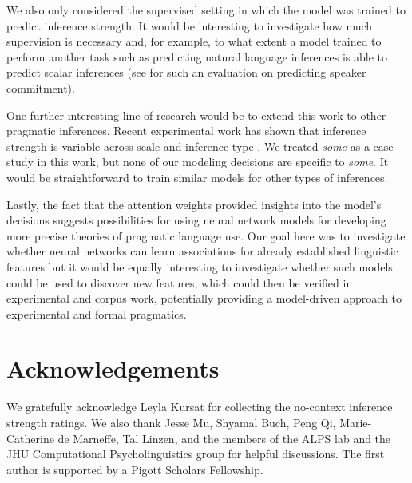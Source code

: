 \documentclass[11pt,a4paper]{article}
\begin{document}
We also only considered the supervised setting in which the model was trained to predict inference strength. It would be interesting to investigate how much supervision is necessary and, for example, to what extent a model trained to perform another task such as predicting natural language inferences is able to predict scalar inferences (see  for such an evaluation on predicting speaker commitment). 

One further interesting line of research would be to extend this work to other pragmatic inferences. Recent experimental work has shown that inference strength is variable across scale and inference type \citep{doran2012novel, van2016scalar}.  We treated \emph{some} as a case study in this work, but none of our modeling decisions are specific to \emph{some}. It would be straightforward to train similar models for other types of inferences.

Lastly, the fact that the attention weights  provided insights into the model's decisions suggests possibilities for using neural network models for developing more precise theories of pragmatic language use. Our goal here was to investigate whether neural networks can learn associations for already established linguistic features but it would be equally interesting to investigate whether such models could be used to discover new features, which could then be verified in experimental and corpus work, potentially providing a model-driven approach to experimental and formal pragmatics.  


\section*{Acknowledgements}
We gratefully acknowledge Leyla Kursat for collecting the 
no-context inference strength ratings. We also thank Jesse Mu, Shyamal Buch, 
Peng Qi, Marie-Catherine de Marneffe, Tal Linzen, and the members of the 
ALPS lab and the JHU Computational Psycholinguistics group for helpful discussions.
The first author is supported by a Pigott Scholars Fellowship.

\end{document}

